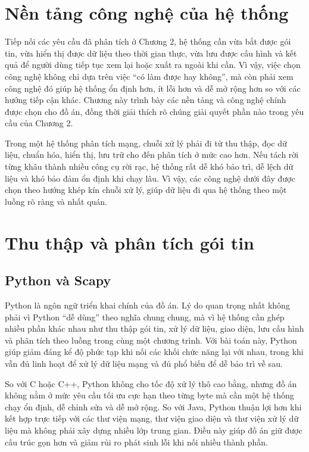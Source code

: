 \documentclass[../DoAn.tex]{subfiles}
\begin{document}
\section{Nền tảng công nghệ của hệ thống}
Tiếp nối các yêu cầu đã phân tích ở Chương 2, hệ thống cần vừa bắt được gói tin, vừa hiển thị được dữ liệu theo thời gian thực, vừa lưu được cấu hình và kết quả để người dùng tiếp tục xem lại hoặc xuất ra ngoài khi cần. Vì vậy, việc chọn công nghệ không chỉ dựa trên việc “có làm được hay không”, mà còn phải xem công nghệ đó giúp hệ thống ổn định hơn, ít lỗi hơn và dễ mở rộng hơn so với các hướng tiếp cận khác. Chương này trình bày các nền tảng và công nghệ chính được chọn cho đồ án, đồng thời giải thích rõ chúng giải quyết phần nào trong yêu cầu của Chương 2.

Trong một hệ thống phân tích mạng, chuỗi xử lý phải đi từ thu thập, đọc dữ liệu, chuẩn hóa, hiển thị, lưu trữ cho đến phân tích ở mức cao hơn. Nếu tách rời từng khâu thành nhiều công cụ rời rạc, hệ thống rất dễ khó bảo trì, dễ lệch dữ liệu và khó bảo đảm ổn định khi chạy lâu. Vì vậy, các công nghệ dưới đây được chọn theo hướng khép kín chuỗi xử lý, giúp dữ liệu đi qua hệ thống theo một luồng rõ ràng và nhất quán.
\section{Thu thập và phân tích gói tin}
\subsection{Python và Scapy}
Python là ngôn ngữ triển khai chính của đồ án. Lý do quan trọng nhất không phải vì Python “dễ dùng” theo nghĩa chung chung, mà vì hệ thống cần ghép nhiều phần khác nhau như thu thập gói tin, xử lý dữ liệu, giao diện, lưu cấu hình và phân tích theo luồng trong cùng một chương trình. Với bài toán này, Python giúp giảm đáng kể độ phức tạp khi nối các khối chức năng lại với nhau, trong khi vẫn đủ linh hoạt để xử lý dữ liệu mạng và đủ phổ biến để dễ bảo trì về sau.

So với C hoặc C++, Python không cho tốc độ xử lý thô cao bằng, nhưng đồ án không nằm ở mức yêu cầu tối ưu cực hạn theo từng byte mà cần một hệ thống chạy ổn định, dễ chỉnh sửa và dễ mở rộng. So với Java, Python thuận lợi hơn khi kết hợp trực tiếp với các thư viện mạng, thư viện giao diện và thư viện xử lý dữ liệu mà không phải xây dựng nhiều lớp trung gian. Điều này giúp đồ án giữ được cấu trúc gọn hơn và giảm rủi ro phát sinh lỗi khi nối nhiều thành phần.
\end{document}
